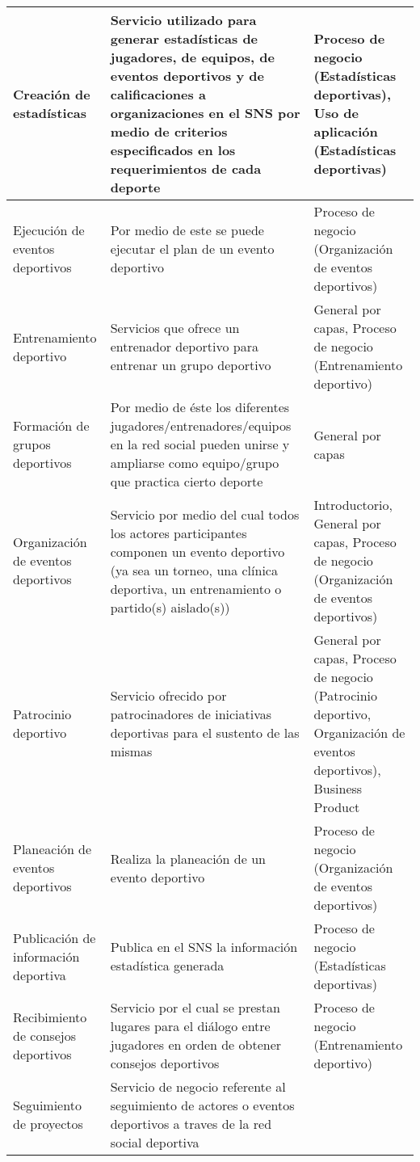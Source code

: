 \begin{center}
\begin{longtable}{|p{4cm}|p{7cm}|p{4cm}|}
		\\
		\hline
		Creación de estadísticas & 
		Servicio utilizado para generar estadísticas de jugadores, de equipos, de eventos deportivos y de calificaciones a organizaciones en el SNS por medio de criterios especificados en los requerimientos de cada deporte & 
		Proceso de negocio (Estadísticas deportivas), Uso de aplicación (Estadísticas deportivas)
		\\
		\hline
		Ejecución de eventos deportivos & 
		Por medio de este se puede ejecutar el plan de un evento deportivo & 
		Proceso de negocio (Organización de eventos deportivos)
		\\
		\hline
		Entrenamiento deportivo & 
		Servicios que ofrece un entrenador deportivo para entrenar un grupo deportivo & 
		General por capas, Proceso de negocio (Entrenamiento deportivo)
		\\
		\hline
		Formación de grupos deportivos & 
		Por medio de éste los diferentes jugadores/entrenadores/equipos en la red social pueden unirse y ampliarse como equipo/grupo que practica cierto deporte & 
		General por capas
		\\
		\hline
		Organización de eventos deportivos & 
		Servicio por medio del cual todos los actores participantes componen un evento deportivo (ya sea un torneo, una clínica deportiva, un entrenamiento o partido(s) aislado(s)) & 
		Introductorio, General por capas, Proceso de negocio (Organización de eventos deportivos)
		\\
		\hline
		Patrocinio deportivo & 
		Servicio ofrecido por patrocinadores de iniciativas deportivas para el sustento de las mismas & 
		General por capas, Proceso de negocio (Patrocinio deportivo, Organización de eventos deportivos), Business Product
		\\
		\hline
		Planeación de eventos deportivos & 
		Realiza la planeación de un evento deportivo & 
		Proceso de negocio (Organización de eventos deportivos)
		\\
		\hline
		Publicación de información deportiva & 
		Publica en el SNS la información estadística generada & 
		Proceso de negocio (Estadísticas deportivas)
		\\
		\hline
		Recibimiento de consejos deportivos & 
		Servicio por el cual se prestan lugares para el diálogo entre jugadores en orden de obtener consejos deportivos & 
		Proceso de negocio (Entrenamiento deportivo)
		\\
		\hline
		Seguimiento de proyectos & 
		Servicio de negocio referente al seguimiento de actores o eventos deportivos a traves de la red social deportiva & 

\end{longtable}
\end{center}
